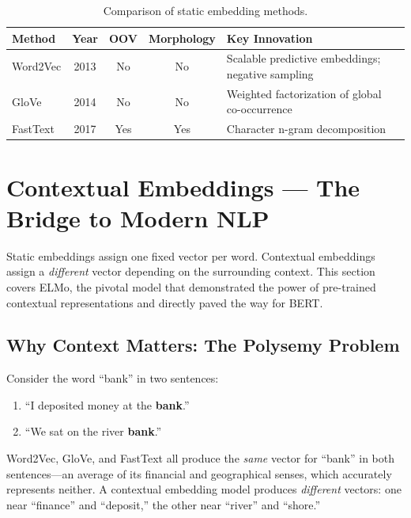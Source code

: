 \begin{table}[H]
\centering
\caption{Comparison of static embedding methods.}
\label{tab:static_embeddings}
\begin{tabularx}{\textwidth}{l c c c X}
\toprule
\textbf{Method} & \textbf{Year} & \textbf{OOV} & \textbf{Morphology}
& \textbf{Key Innovation} \\
\midrule
Word2Vec & 2013 & No & No & Scalable predictive embeddings; negative sampling \\
GloVe & 2014 & No & No & Weighted factorization of global co-occurrence \\
FastText & 2017 & Yes & Yes & Character n-gram decomposition \\
\bottomrule
\end{tabularx}
\end{table}


\section{Contextual Embeddings --- The Bridge to Modern NLP}
\label{sec:contextual_embeddings}

Static embeddings assign one fixed vector per word.  Contextual embeddings
assign a \emph{different} vector depending on the surrounding context.  This
section covers ELMo, the pivotal model that demonstrated the power of
pre-trained contextual representations and directly paved the way for BERT.

\subsection{Why Context Matters: The Polysemy Problem}

Consider the word ``bank'' in two sentences:
\begin{enumerate}
    \item ``I deposited money at the \textbf{bank}.''
    \item ``We sat on the river \textbf{bank}.''
\end{enumerate}

Word2Vec, GloVe, and FastText all produce the \emph{same} vector for ``bank''
in both sentences---an average of its financial and geographical senses,
which accurately represents neither.  A contextual embedding model produces
\emph{different} vectors: one near ``finance'' and ``deposit,'' the other near
``river'' and ``shore.''


